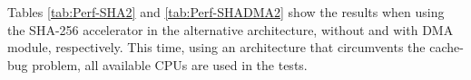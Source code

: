 \begin{appendix}
Tables \ref{tab:Perf-SHA2} and \ref{tab:Perf-SHADMA2} show the results when using the SHA-256 accelerator in the alternative architecture, without and with DMA module, respectively.
This time, using an architecture that circumvents the cache-bug problem, all available CPUs are used in the tests.

%
%
%


\end{appendix}
